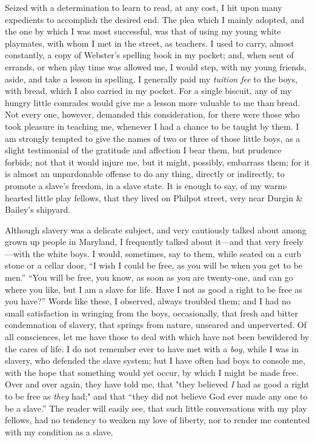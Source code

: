 Seized with a determination to learn to read, at any cost, I hit upon
many expedients to accomplish the desired end. The plea which I mainly
adopted, and the one by which I was most successful, was that of using
my young white playmates, with whom I met in the street, as teachers. I
used to carry, almost constantly, a copy of Webster's spelling book in
my pocket; and, when sent of errands, or when play time was allowed me,
I would step, with my young friends, aside, and take a lesson in
spelling. I generally paid my \emph{tuition fee} to the boys, with
bread, which I also carried in my pocket. For a single biscuit, any of
my hungry little comrades would give me a lesson more valuable to me
than bread. Not every one, however, demanded this consideration, for
there were those who took pleasure in teaching me, whenever I had a
chance to be taught by them. I am strongly tempted to give the names of
two or three of those little boys, as a slight testimonial of the
gratitude and affection I bear them, but prudence forbids; not that it
would injure me, but it might, possibly, embarrass them; for it is
almost an unpardonable offense to do any thing, directly or indirectly,
to promote a slave's freedom, in a slave state. It is enough to say, of
my warm-hearted little play fellows, that they lived on Philpot street,
very near Durgin \& Bailey's shipyard.

Although slavery was a delicate subject, and very cautiously talked
about among grown up people in Maryland, I frequently talked about
it---and that very {\protect\hypertarget{156}{}{}}freely---with the
white boys. I would, sometimes, say to them, while seated on a curb
stone or a cellar door, ``I wish I could be free, as you will be when
you get to be men.'' ``You will be free, you know, as soon as you are
twenty-one, and can go where you like, but I am a slave for life. Have I
not as good a right to be free as you have?'' Words like these, I
observed, always troubled them; and I had no small satisfaction in
wringing from the boys, occasionally, that fresh and bitter condemnation
of slavery, that springs from nature, unseared and unperverted. Of all
consciences, let me have those to deal with which have not been
bewildered by the cares of life. I do not remember ever to have met with
a \emph{boy}, while I was in slavery, who defended the slave system; but
I have often had boys to console me, with the hope that something would
yet occur, by which I might be made free. Over and over again, they have
told me, that "they believed \emph{I} had as good a right to be free as
\emph{they} had;" and that ``they did not believe God ever made any one
to be a slave.'' The reader will easily see, that such little
conversations with my play fellows, had no tendency to weaken my love of
liberty, nor to render me contented with my condition as a slave.

